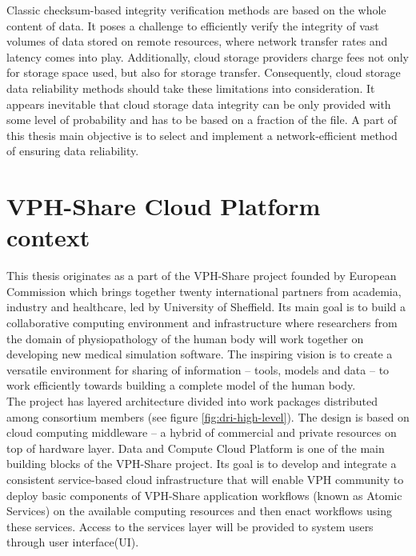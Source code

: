 Classic checksum-based integrity verification methods are based on the whole content of data. It
poses a challenge to efficiently verify the integrity of vast volumes of data stored on remote resources,
where network transfer rates and latency comes into play. Additionally, cloud
storage providers charge fees not only for storage space used, but also for storage transfer.
Consequently, cloud storage data reliability methods should take these limitations into
consideration. It appears inevitable that cloud storage data integrity can be only provided with
some level of probability and has to be based on a fraction of the file. A part of this thesis main
objective is to select and implement a network-efficient method of ensuring data reliability.


\section{VPH-Share Cloud Platform context}
This thesis originates as a part of the VPH-Share project founded by European Commission
which brings together twenty international partners from academia, industry and healthcare,
led by University of Sheffield. Its main goal is to build a collaborative computing
environment and infrastructure where researchers from the domain of physiopathology of
the human body will work together on developing new medical simulation software. The inspiring
vision is to create a versatile environment for sharing of information -- tools, models and data
-- to work efficiently towards building a complete model of the human body.\\

The project has layered architecture divided into work packages distributed among consortium
members (see figure \ref{fig:dri-high-level}). The design is based on cloud computing middleware
-- a hybrid of commercial and private resources on top of hardware layer. Data and Compute
Cloud Platform is one of the main building blocks of the VPH-Share project. Its goal is to
develop and integrate a consistent service-based cloud infrastructure that will enable VPH
community to deploy basic components of VPH-Share application workflows (known as Atomic Services)
on the available computing resources and then enact workflows using these services. Access to the
services layer will be provided to system users through user interface(UI).

